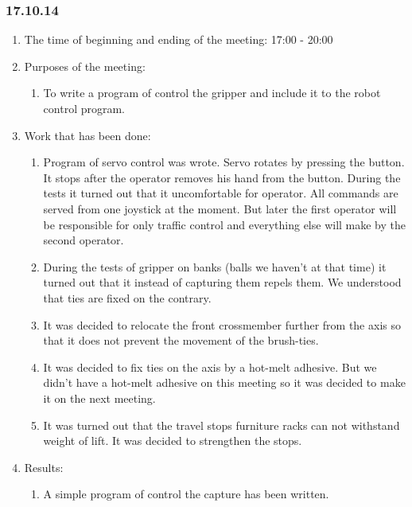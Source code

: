 
\subsubsection{17.10.14}

\begin{enumerate}
	\item The time of beginning and ending of the meeting:
	17:00 - 20:00
	\item Purposes of the meeting:
	\begin{enumerate}
	  \item To write a program of control the gripper and include it to the robot control program.
	  
    \end{enumerate}
    
	\item Work that has been done:
	\begin{enumerate}
	  \item Program of servo control was wrote. Servo rotates by pressing the button. It stops after the operator removes his hand from the button. During the tests it turned out that it uncomfortable for operator. All commands are served from one joystick at the moment. But later the first operator will be responsible for only traffic control and everything else will make by the second operator.
      
      \item During the tests of gripper on banks (balls we haven't at that time) it turned out that it instead of capturing them repels them. We understood that ties are fixed on the contrary.
      
      \item It was decided to relocate the front crossmember further from the axis so that it does not prevent the movement of the brush-ties.
      
      \item It was decided to fix ties on the axis by a hot-melt adhesive. But we didn't have a hot-melt adhesive on this meeting so it was decided to make it on the next meeting.
      
      \item It was turned out that the travel stops furniture racks can not withstand weight of lift. It was decided to strengthen the stops.
      
    \end{enumerate}
    
	\item Results: 
	\begin{enumerate}
	  \item A simple program of control the capture has been written.
	  

\end{enumerate}
\end{enumerate}
